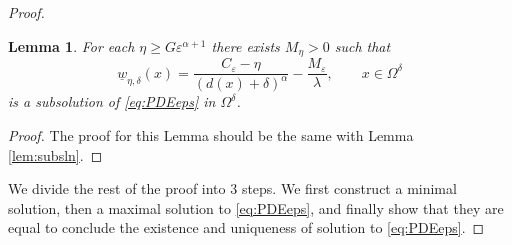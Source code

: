 \documentclass[11pt,reqno]{amsart}
\numberwithin{figure}{section}
\theoremstyle{plain}
\newtheorem{lem}[thm]{Lemma}
\theoremstyle{remark}
\numberwithin{equation}{section}
\begin{document}
\begin{proof}
\begin{lem}\label{lem:supersln} For each $\eta\geq G\varepsilon^{\alpha+1}$ there exists $M_\eta > 0$ such that 
\begin{equation*}
    \underline{w}_{\eta, \delta}(x) = \frac{C_\varepsilon-\eta}{(d(x)+\delta)^\alpha} -\frac{M_\varepsilon}{\lambda}, \qquad x\in \Omega^\delta 
\end{equation*}
is a subsolution of \eqref{eq:PDEeps} in $\Omega^\delta$.
\end{lem}

\begin{proof} The proof for this Lemma should be the same with Lemma \ref{lem:subsln}.
\end{proof}

\noindent We divide the rest of the proof into 3 steps. We first construct a minimal solution, then a maximal solution to \eqref{eq:PDEeps}, and finally show that they are equal to conclude the existence and uniqueness of solution to \eqref{eq:PDEeps}.


\end{proof}
\end{document}
